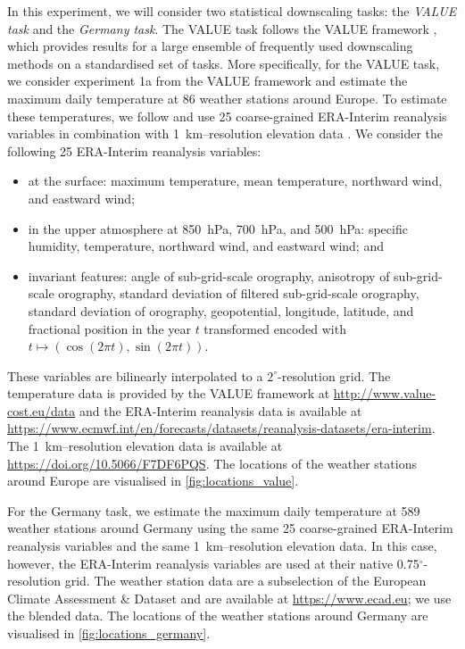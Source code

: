 \documentclass[12pt, twoside]{report}
\begin{document}
In this experiment, we will consider two statistical downscaling tasks:
the \emph{VALUE task} and the \emph{Germany task}.
The VALUE task follows the VALUE framework \parencite{Maraun:2015:VALUE_A_Framework_to_Validate}, which provides results for a large ensemble of frequently used downscaling methods on a standardised set of tasks.
More specifically, for the VALUE task, we consider experiment 1a from the VALUE framework
and estimate the maximum daily temperature at 86 weather stations around Europe.
To estimate these temperatures, we follow \textcite{Vaughan:2022:Convolutional_Conditional_Neural_Processes_for} and use 25 coarse-grained ERA-Interim reanalysis variables \parencite{Dee:2011:The_ERA-Interim_Reanalysis_Configuration_and} in combination with \SI{1}{km}--resolution elevation data \parencite{EROSC:1997:GPTOTO30}.
We consider the following 25 ERA-Interim reanalysis variables:
\begin{itemize}
    \item at the surface: maximum temperature, mean temperature, northward wind, and eastward wind;
    \item in the upper atmosphere at \SI{850}{hPa}, \SI{700}{hPa}, and \SI{500}{hPa}: specific humidity, temperature, northward wind, and eastward wind; and
    \item
        invariant features:
        angle of sub-grid-scale orography,
        anisotropy of sub-grid-scale orography,
        standard deviation of filtered sub-grid-scale orography,
        standard deviation of orography,
        geopotential,
        longitude,
        latitude, and
        fractional position in the year $t$ transformed encoded with $t \mapsto (\cos(2\pi t), \sin(2 \pi t))$.
\end{itemize}
These variables are bilinearly interpolated to a $2^\circ$-resolution grid.
The temperature data is provided by the VALUE framework at \url{http://www.value-cost.eu/data} and the ERA-Interim reanalysis data is available at \url{https://www.ecmwf.int/en/forecasts/datasets/reanalysis-datasets/era-interim}.
The \SI{1}{km}--resolution elevation data is available at
\url{https://doi.org/10.5066/F7DF6PQS}.
The locations of the weather stations around Europe are visualised in \cref{fig:locations_value}.

For the Germany task, we estimate the maximum daily temperature at 589 weather stations around Germany using the same 25 coarse-grained ERA-Interim reanalysis variables and the same \SI{1}{km}--resolution elevation data.
In this case, however, the ERA-Interim reanalysis variables are used at their native 0.75$^\circ$-resolution grid.
The weather station data are a subselection of the European Climate Assessment \& Dataset \parencite{Klein_Tank:2002:Daily_Dataset_of_20th-Century_Surface} and are available at \url{https://www.ecad.eu};
we use the blended data.
The locations of the weather stations around Germany are visualised in \cref{fig:locations_germany}.
\end{document}
